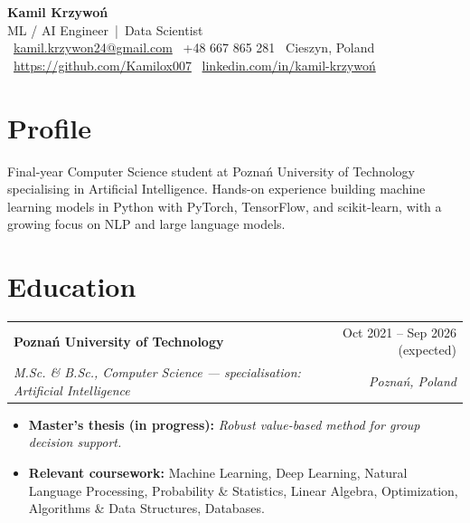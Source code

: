 \documentclass[10pt, a4paper]{article}
\makeatletter
\newcommand{\entry}[4]{%
    \noindent\begin{tabularx}{\textwidth}{@{}X r@{}}
        \textbf{#1} & \textcolor{muted}{#2} \\
        \textit{#3} & \textcolor{muted}{\textit{#4}} \\
    \end{tabularx}\vspace{2pt}
}
\makeatother
\begin{document}
\begin{center}
    {\Huge\bfseries\color{accent} Kamil Krzywoń}\\[4pt]
    {\large\color{muted} ML / AI Engineer \,|\, Data Scientist}\\[6pt]
    \small
    \faEnvelope[regular]\ \href{mailto:kamil.krzywon24@gmail.com}{kamil.krzywon24@gmail.com}
    \;\;\textbar\;\;
    \faPhone\ +48 667 865 281
    \;\;\textbar\;\;
    \faMapMarker*\ Cieszyn, Poland
    \\[2pt]
    \faGithub\ \href{https://github.com/Kamilox007}{https://github.com/Kamilox007}
    \;\;\textbar\;\;
    \faLinkedin\ \href{https://www.linkedin.com/in/kamil-krzywo\%C5\%84-349354314/}{linkedin.com/in/kamil-krzywoń}
\end{center}

\vspace{4pt}

\section*{Profile}
Final-year Computer Science student at Poznań University of Technology specialising in
Artificial Intelligence. Hands-on experience building machine learning models in Python
with PyTorch, TensorFlow, and scikit-learn, with a growing focus on NLP and large language
models.

\section*{Education}

\entry{Poznań University of Technology}{Oct 2021 -- Sep 2026 (expected)}
      {M.Sc. \& B.Sc., Computer Science --- specialisation: Artificial Intelligence}{Poznań, Poland}
\vspace{2pt}
\begin{itemize}
    \item \textbf{Master's thesis (in progress):} \emph{Robust value-based method for group decision support.}
    \item \textbf{Relevant coursework:} Machine Learning, Deep Learning, Natural Language Processing,
          Probability \& Statistics, Linear Algebra, Optimization, Algorithms \& Data Structures, Databases.
\end{itemize}
\end{document}
